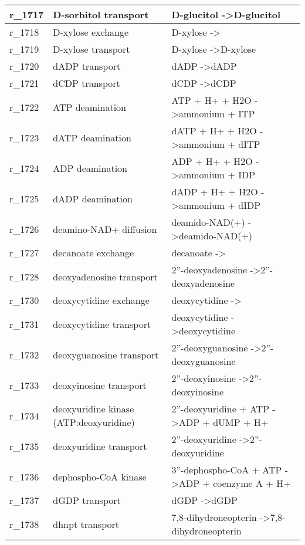 \begin{landscape}
{\begin{longtable}{|l|p{7cm}|p{15cm}|}
r\_1717 & D-sorbitol transport & D-glucitol  -\textgreater D-glucitol \\ \hline
r\_1718 & D-xylose exchange & D-xylose  -\textgreater{} \\ \hline
r\_1719 & D-xylose transport & D-xylose  -\textgreater D-xylose \\ \hline
r\_1720 & dADP transport & dADP  -\textgreater dADP \\ \hline
r\_1721 & dCDP transport & dCDP  -\textgreater dCDP \\ \hline
r\_1722 & ATP deamination & ATP + H+ + H2O  -\textgreater ammonium + ITP \\ \hline
r\_1723 & dATP deamination & dATP + H+ + H2O  -\textgreater ammonium + dITP \\ \hline
r\_1724 & ADP deamination & ADP + H+ + H2O  -\textgreater ammonium + IDP \\ \hline
r\_1725 & dADP deamination & dADP + H+ + H2O  -\textgreater ammonium + dIDP \\ \hline
r\_1726 & deamino-NAD+ diffusion & deamido-NAD(+)  -\textgreater deamido-NAD(+) \\ \hline
r\_1727 & decanoate exchange & decanoate  -\textgreater{} \\ \hline
r\_1728 & deoxyadenosine transport & 2''-deoxyadenosine  -\textgreater 2''-deoxyadenosine \\ \hline
r\_1730 & deoxycytidine exchange & deoxycytidine  -\textgreater{} \\ \hline
r\_1731 & deoxycytidine transport & deoxycytidine  -\textgreater deoxycytidine \\ \hline
r\_1732 & deoxyguanosine transport & 2''-deoxyguanosine  -\textgreater 2''-deoxyguanosine \\ \hline
r\_1733 & deoxyinosine transport & 2''-deoxyinosine  -\textgreater 2''-deoxyinosine \\ \hline
r\_1734 & deoxyuridine kinase (ATP:deoxyuridine) & 2''-deoxyuridine + ATP  -\textgreater ADP + dUMP + H+ \\ \hline
r\_1735 & deoxyuridine transport & 2''-deoxyuridine  -\textgreater 2''-deoxyuridine \\ \hline
r\_1736 & dephospho-CoA kinase & 3''-dephospho-CoA + ATP  -\textgreater ADP + coenzyme A + H+ \\ \hline
r\_1737 & dGDP transport & dGDP  -\textgreater dGDP \\ \hline
r\_1738 & dhnpt transport & 7,8-dihydroneopterin  -\textgreater 7,8-dihydroneopterin \\ \hline

\end{longtable}}
\end{landscape}
